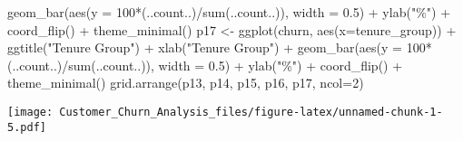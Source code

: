 \documentclass[
]{article}
\newenvironment{Shaded}{\begin{snugshade}}{\end{snugshade}}
\newcommand{\AttributeTok}[1]{\textcolor[rgb]{0.77,0.63,0.00}{#1}}
\newcommand{\CommentTok}[1]{\textcolor[rgb]{0.56,0.35,0.01}{\textit{#1}}}
\newcommand{\ConstantTok}[1]{\textcolor[rgb]{0.00,0.00,0.00}{#1}}
\newcommand{\DecValTok}[1]{\textcolor[rgb]{0.00,0.00,0.81}{#1}}
\newcommand{\DocumentationTok}[1]{\textcolor[rgb]{0.56,0.35,0.01}{\textbf{\textit{#1}}}}
\newcommand{\FloatTok}[1]{\textcolor[rgb]{0.00,0.00,0.81}{#1}}
\newcommand{\FunctionTok}[1]{\textcolor[rgb]{0.00,0.00,0.00}{#1}}
\newcommand{\NormalTok}[1]{#1}
\newcommand{\OtherTok}[1]{\textcolor[rgb]{0.56,0.35,0.01}{#1}}
\newcommand{\SpecialCharTok}[1]{\textcolor[rgb]{0.00,0.00,0.00}{#1}}
\newcommand{\StringTok}[1]{\textcolor[rgb]{0.31,0.60,0.02}{#1}}
\begin{document}
\begin{Shaded}
\begin{Highlighting}[]
  \FunctionTok{geom\_bar}\NormalTok{(}\FunctionTok{aes}\NormalTok{(}\AttributeTok{y =} \DecValTok{100}\SpecialCharTok{*}\NormalTok{(..count..)}\SpecialCharTok{/}\FunctionTok{sum}\NormalTok{(..count..)), }\AttributeTok{width =} \FloatTok{0.5}\NormalTok{) }\SpecialCharTok{+} \FunctionTok{ylab}\NormalTok{(}\StringTok{"\%"}\NormalTok{) }\SpecialCharTok{+} \FunctionTok{coord\_flip}\NormalTok{() }\SpecialCharTok{+} \FunctionTok{theme\_minimal}\NormalTok{()}
\NormalTok{p17 }\OtherTok{\textless{}{-}} \FunctionTok{ggplot}\NormalTok{(churn, }\FunctionTok{aes}\NormalTok{(}\AttributeTok{x=}\NormalTok{tenure\_group)) }\SpecialCharTok{+} \FunctionTok{ggtitle}\NormalTok{(}\StringTok{"Tenure Group"}\NormalTok{) }\SpecialCharTok{+} \FunctionTok{xlab}\NormalTok{(}\StringTok{"Tenure Group"}\NormalTok{) }\SpecialCharTok{+}
  \FunctionTok{geom\_bar}\NormalTok{(}\FunctionTok{aes}\NormalTok{(}\AttributeTok{y =} \DecValTok{100}\SpecialCharTok{*}\NormalTok{(..count..)}\SpecialCharTok{/}\FunctionTok{sum}\NormalTok{(..count..)), }\AttributeTok{width =} \FloatTok{0.5}\NormalTok{) }\SpecialCharTok{+} \FunctionTok{ylab}\NormalTok{(}\StringTok{"\%"}\NormalTok{) }\SpecialCharTok{+} \FunctionTok{coord\_flip}\NormalTok{() }\SpecialCharTok{+} \FunctionTok{theme\_minimal}\NormalTok{()}
\FunctionTok{grid.arrange}\NormalTok{(p13, p14, p15, p16, p17, }\AttributeTok{ncol=}\DecValTok{2}\NormalTok{)}
\end{Highlighting}
\end{Shaded}

\texttt{[image: Customer\_Churn\_Analysis\_files/figure-latex/unnamed-chunk-1-5.pdf]}

\begin{Shaded}
\end{Shaded}
\end{document}
